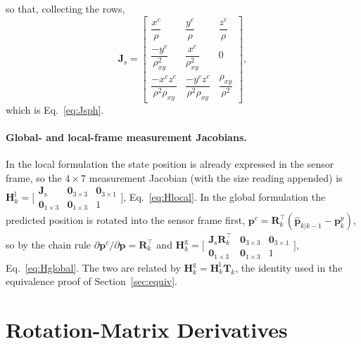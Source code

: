 so that, collecting the rows,
\begin{equation}
  \bm{J}_{\mathrm{s}} =
  \begin{bmatrix}
    \dfrac{x^{c}}{\rho} & \dfrac{y^{c}}{\rho} & \dfrac{z^{c}}{\rho}\\[8pt]
    \dfrac{-y^{c}}{\rho_{xy}^{2}} & \dfrac{x^{c}}{\rho_{xy}^{2}} & 0\\[8pt]
    \dfrac{-x^{c}z^{c}}{\rho^{2}\rho_{xy}} & \dfrac{-y^{c}z^{c}}{\rho^{2}\rho_{xy}} & \dfrac{\rho_{xy}}{\rho^{2}}
  \end{bmatrix},
\end{equation}
which is Eq.~\eqref{eq:Jsph}.

\paragraph*{Global- and local-frame measurement Jacobians.}
In the local formulation the state position is already expressed in the sensor
frame, so the $4\times7$ measurement Jacobian (with the size reading appended)
is $\bm{H}^{\mathrm{l}}_k=\big[\begin{smallmatrix}\bm{J}_{\mathrm{s}} & \bm{0}_{3\times3} & \bm{0}_{3\times1}\\ \bm{0}_{1\times3} & \bm{0}_{1\times3} & 1\end{smallmatrix}\big]$,
Eq.~\eqref{eq:Hlocal}. In the global formulation the predicted position is rotated
into the sensor frame first, $\bm{p}^{c}=\bm{R}_k^{\top}(\hat{\bm{p}}_{k|k-1}-\bm{p}^{p}_k)$,
so by the chain rule $\partial\bm{p}^{c}/\partial\bm{p}=\bm{R}_k^{\top}$ and
$\bm{H}^{\mathrm{g}}_k=\big[\begin{smallmatrix}\bm{J}_{\mathrm{s}}\bm{R}_k^{\top} & \bm{0}_{3\times3} & \bm{0}_{3\times1}\\ \bm{0}_{1\times3} & \bm{0}_{1\times3} & 1\end{smallmatrix}\big]$,
Eq.~\eqref{eq:Hglobal}. The two are related by $\bm{H}^{\mathrm{g}}_k=\bm{H}^{\mathrm{l}}_k\bm{T}_k$,
the identity used in the equivalence proof of Section~\ref{sec:equiv}.

\section{Rotation-Matrix Derivatives}
\label{ap:rot_jac}

